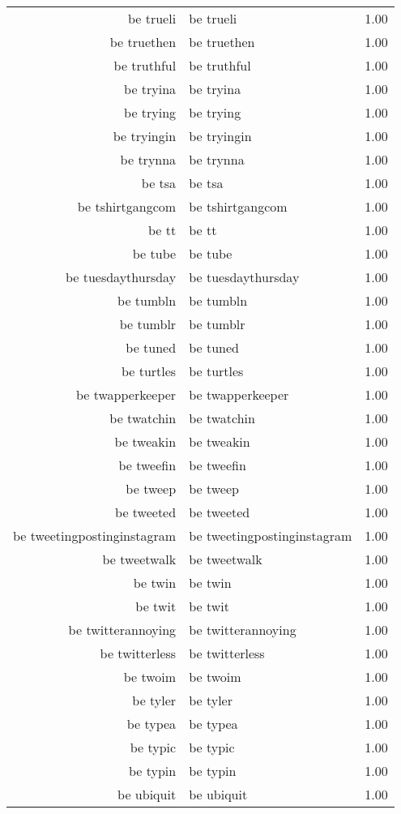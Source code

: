 \begin{table}[ht]
\begin{tabular}{rlr}
  be trueli & be trueli & 1.00 \\ 
  be truethen & be truethen & 1.00 \\ 
  be truthful & be truthful & 1.00 \\ 
  be tryina & be tryina & 1.00 \\ 
  be trying & be trying & 1.00 \\ 
  be tryingin & be tryingin & 1.00 \\ 
  be trynna & be trynna & 1.00 \\ 
  be tsa & be tsa & 1.00 \\ 
  be tshirtgangcom & be tshirtgangcom & 1.00 \\ 
  be tt & be tt & 1.00 \\ 
  be tube & be tube & 1.00 \\ 
  be tuesdaythursday & be tuesdaythursday & 1.00 \\ 
  be tumbln & be tumbln & 1.00 \\ 
  be tumblr & be tumblr & 1.00 \\ 
  be tuned & be tuned & 1.00 \\ 
  be turtles & be turtles & 1.00 \\ 
  be twapperkeeper & be twapperkeeper & 1.00 \\ 
  be twatchin & be twatchin & 1.00 \\ 
  be tweakin & be tweakin & 1.00 \\ 
  be tweefin & be tweefin & 1.00 \\ 
  be tweep & be tweep & 1.00 \\ 
  be tweeted & be tweeted & 1.00 \\ 
  be tweetingpostinginstagram & be tweetingpostinginstagram & 1.00 \\ 
  be tweetwalk & be tweetwalk & 1.00 \\ 
  be twin & be twin & 1.00 \\ 
  be twit & be twit & 1.00 \\ 
  be twitterannoying & be twitterannoying & 1.00 \\ 
  be twitterless & be twitterless & 1.00 \\ 
  be twoim & be twoim & 1.00 \\ 
  be tyler & be tyler & 1.00 \\ 
  be typea & be typea & 1.00 \\ 
  be typic & be typic & 1.00 \\ 
  be typin & be typin & 1.00 \\ 
  be ubiquit & be ubiquit & 1.00 \\ 

\end{tabular}
\end{table}
